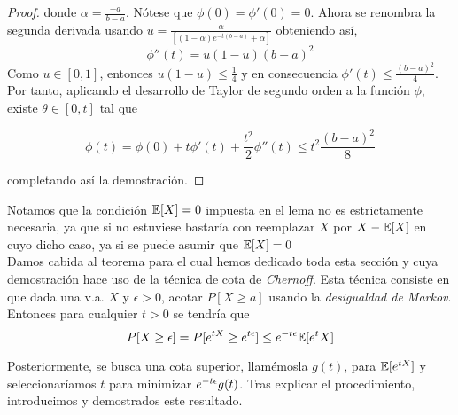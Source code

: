 \begin{proof}
            \noindent donde $\alpha = \frac{-a}{b-a}$. Nótese que $\phi(0) = \phi'(0) = 0$. Ahora se renombra la segunda derivada usando $u=\frac{\alpha}{[(1-\alpha) e^{-t(b-a)} + \alpha]}$ obteniendo así,
            \begin{equation}
                \phi''(t) = u(1-u)(b-a)^2
            \end{equation}
            \noindent Como $u \in [0,1]$, entonces $u(1-u) \leq \frac{1}{4}$ y en consecuencia $\phi'(t) \leq \frac{(b-a)^2}{4}$. Por tanto, aplicando el desarrollo de Taylor de segundo orden a la función $\phi$, existe $\theta \in [0,t]$ tal que
            
            \begin{equation}
                \phi(t) = \phi(0) + t\phi'(t) + \frac{t^2}{2}\phi''(t) \leq t^2 \frac{(b-a)^2}{8}
            \end{equation}
            
            \noindent completando así la demostración. 
            
        \end{proof}
    
    
    
     Notamos que la condición $\mathbb{E}[X] = 0$ impuesta en el lema no es estrictamente necesaria, ya que si no estuviese bastaría con reemplazar $X$ por $X - \mathbb{E}[X]$ en cuyo dicho caso, ya si se puede asumir que $\mathbb{E}[X] = 0$ \\
    
    Damos cabida al teorema para el cual hemos dedicado toda esta sección y cuya demostración hace uso de la técnica de cota de \textit{Chernoff}. Esta técnica consiste en que dada una v.a. $X$ y $\epsilon > 0$, acotar $P[X \geq a]$ usando la \textit{desigualdad de Markov}. Entonces  para cualquier $t>0$ se tendría que 
    \begin{equation}
        P[X \geq \epsilon ] = P [e^{tX} \geq e^{t\epsilon}] \leq e^{-t\epsilon} \mathbb{E}[e^tX]
    \end{equation}
    
    \noindent Posteriormente, se busca una cota superior, llamémosla $g(t)$, para $\mathbb{E}[e^{tX}]$ y seleccionaríamos $t$ para minimizar $e^{-t\epsilon}g(t)$. Tras explicar el procedimiento, introducimos y demostrados este resultado. \\
    
